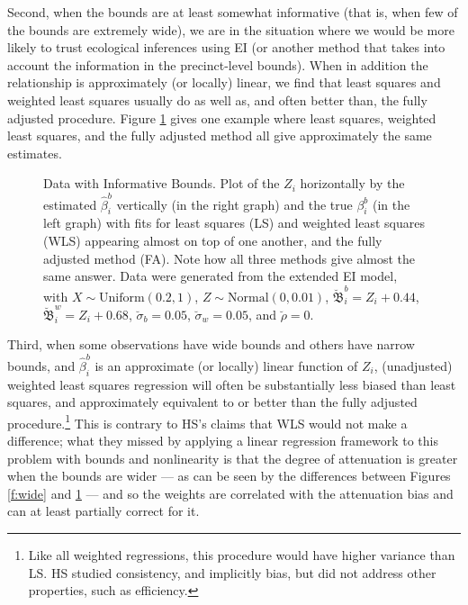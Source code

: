 \documentclass[11pt,titlepage]{article}
\newcommand{\bbeta}{{\mathfrak B}}
\newcommand{\sigmau}{\breve{\sigma}}
\newcommand{\rhou}{\breve{\rho}}
\begin{document}
Second, when the bounds are at least somewhat informative (that is,
when few of the bounds are extremely wide), we are in the situation
where we would be more likely to trust ecological inferences using EI
(or another method that takes into account the information in the
precinct-level bounds).  When in addition the relationship is
approximately (or locally) linear, we find that least squares and
weighted least squares usually do as well as, and often better than,
the fully adjusted procedure.  Figure \ref{f:narrow} gives one example
where least squares, weighted least squares, and the fully adjusted
method all give approximately the same estimates.
\begin{figure}[t]
  \begin{center}
    \caption{Data with Informative Bounds. Plot of the $Z_i$ horizontally by
      the estimated $\hat\beta_i^b$ vertically (in the right graph)
      and the true $\beta_i^b$ (in the left graph) with fits for least
      squares (LS) and weighted least squares (WLS) appearing almost on
      top of one another, and the fully adjusted method (FA).  Note
      how all three methods give almost the same answer. Data were
      generated from the extended EI model, with $X \sim
      \textrm{Uniform}(0.2,1)$, $Z \sim \textrm{Normal}(0,0.01)$,
      $\breve\bbeta_i^b = Z_i + 0.44$, $\breve\bbeta_i^w = Z_i +
      0.68$, $\sigmau_b = 0.05$, $\sigmau_w = 0.05$, and $\rhou = 0$.}
    \label{f:narrow}
  \end{center}
\end{figure}

Third, when some observations have wide bounds and others have narrow
bounds, and $\hat\beta_i^b$ is an approximate (or locally) linear
function of $Z_i$, (unadjusted) weighted least squares regression will
often be substantially less biased than least squares, and
approximately equivalent to or better than the fully adjusted
procedure.\footnote{Like all weighted regressions, this procedure
  would have higher variance than LS. HS studied consistency, and
  implicitly bias, but did not address other properties, such as
  efficiency.}  This is contrary to
HS's claims that WLS would not make a difference; what they missed by
applying a linear regression framework to this problem with bounds and
nonlinearity is that the degree of attenuation is greater when the
bounds are wider --- as can be seen by the differences between Figures
\ref{f:wide} and \ref{f:narrow} --- and so the weights are correlated
with the attenuation bias and can at least partially correct for it.
\end{document}
